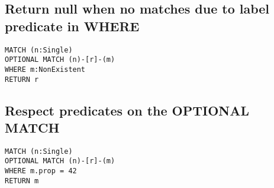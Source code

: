 \subsection{Return null when no matches due to label predicate in WHERE}

\begin{lstlisting}
MATCH (n:Single)
OPTIONAL MATCH (n)-[r]-(m)
WHERE m:NonExistent
RETURN r
\end{lstlisting}

\subsection{Respect predicates on the OPTIONAL MATCH}

\begin{lstlisting}
MATCH (n:Single)
OPTIONAL MATCH (n)-[r]-(m)
WHERE m.prop = 42
RETURN m
\end{lstlisting}

